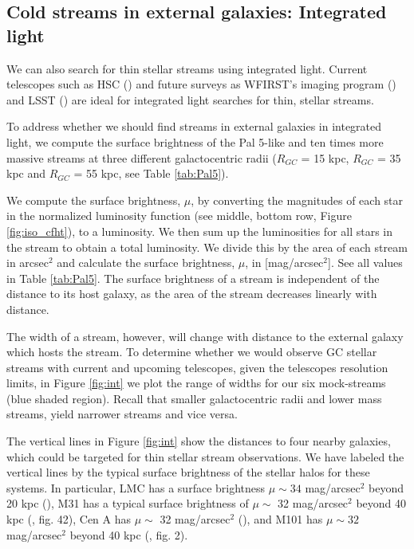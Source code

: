 \documentclass[twocolumn]{aastex62}
\begin{document}
\subsection{Cold streams in external galaxies: Integrated light}
\label{sec:integrated}
We can also search for thin stellar streams using integrated light. Current telescopes such as HSC (\citealt{miyazaki12}) and future surveys as WFIRST's imaging program (\citealt{spergel13}) and LSST  (\citealt{ivezi08}) are ideal for integrated light searches for thin, stellar streams. 

To address whether we should find streams in external galaxies in integrated light, we compute the surface brightness of the Pal 5-like and ten times more massive streams at three different galactocentric radii ($R_{GC}$ = 15  kpc, $R_{GC}$ = 35 kpc and $R_{GC}$ = 55 kpc, see Table \ref{tab:Pal5}). 

We compute the surface brightness, $\mu$, by converting the magnitudes of each star in the normalized luminosity function (see middle, bottom row, Figure \ref{fig:iso_cfht}), to a luminosity. We then sum up the luminosities for all stars in the stream to obtain a total luminosity. We divide this by the area of each stream in arcsec$^2$ and calculate the surface brightness, $\mu$, in [mag/arcsec$^2$]. See all values in Table \ref{tab:Pal5}. The surface brightness of a stream is independent of the distance to its host galaxy, as the area of the stream decreases linearly with distance. 

The width of a stream, however, will change with distance to the external galaxy which hosts the stream. To determine whether we would observe GC stellar streams with current and upcoming telescopes, given the telescopes resolution limits, in Figure \ref{fig:int} we plot the range of widths for our six mock-streams (blue shaded region). Recall that smaller galactocentric radii and lower mass streams, yield narrower streams and vice versa. %

The vertical lines in Figure \ref{fig:int} show the distances to four nearby galaxies, which could be targeted for thin stellar stream observations. We have labeled the vertical lines by the typical surface brightness of the stellar halos for these systems. In particular, LMC has a surface brightness $\mu \sim 34$ mag/arcsec$^2$ beyond 20 kpc (\citealt{nidever18}), M31 has a typical surface brightness of  $\mu \sim$ 32 mag/arcsec$^2$ beyond 40 kpc (\citealt{ibata07}, fig. 42), Cen A has  $\mu \sim $ 32 mag/arcsec$^2$ (\citealt{crno16}), and M101 has  $\mu \sim 32 $ mag/arcsec$^2$ beyond 40 kpc (\citealt{dokkum14}, fig. 2).
\end{document}
